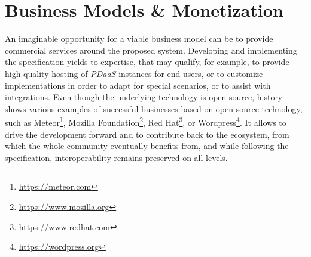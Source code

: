 \documentclass[12pt,english,a4paper,titlepage,cleardoublepage=empty,dottedtoc]{report}
\renewcommand{\href}[2]{#2\footnote{\url{#1}}}
\begin{document}
\section{Business Models \&
Monetization}\label{business-models-monetization}

An imaginable opportunity for a viable business model can be to provide
commercial services around the proposed system. Developing and
implementing the specification yields to expertise, that may qualify,
for example, to provide high-quality hosting of \emph{PDaaS} instances
for end users, or to customize implementations in order to adapt for
special scenarios, or to assist with integrations. Even though the
underlying technology is open source, history shows various examples of
successful businesses based on open source technology, such as
\href{https://meteor.com}{Meteor},
\href{https://www.mozilla.org}{Mozilla Foundation},
\href{https://www.redhat.com}{Red Hat}, or
\href{https://wordpress.org}{Wordpress}. It allows to drive the
development forward and to contribute back to the ecosystem, from which
the whole community eventually benefits from, and while following the
specification, interoperability remains preserved on all levels.
\end{document}
